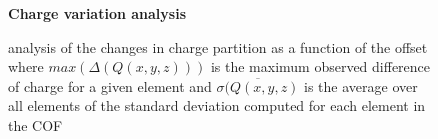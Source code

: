 \begin{figure}[H]
\begin{centering}
\textbf{Charge variation analysis}\par\medskip
{}
\caption{analysis of the changes in charge partition as a function of the offset where $max(\Delta(Q(x,y,z)))$ is the maximum observed difference of charge for a given element and $\overline{\sigma(Q(x,y,z)}$ is the average over all elements of the standard deviation computed for each element in the COF}
\label{fig:chg_var}
\end{centering}
\end{figure}